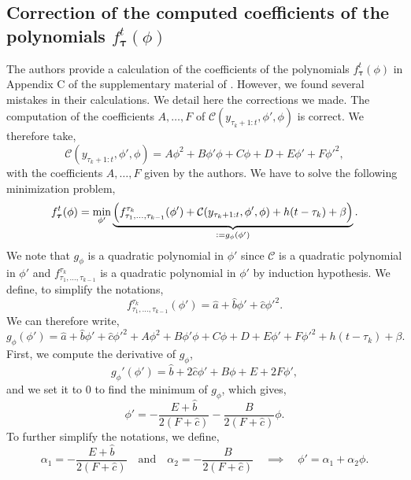 \documentclass[11pt]{article}
\begin{document}
\subsection{Correction of the computed coefficients of the polynomials $f^t_{\boldsymbol{\tau}}(\phi)$}
The authors provide a calculation of the coefficients of the polynomials $f^t_{\boldsymbol{\tau}}(\phi)$ in Appendix C of the supplementary material of \cite{mainarticle}. However, we found several mistakes in their calculations. We detail here the corrections we made.
\jump
The computation of the coefficients $A,\dots,F$ of $\mathcal{C}(y_{\tau_k+1:t},\phi',\phi)$ is correct. We therefore take,
\begin{equation}
    \mathcal{C}(y_{\tau_k+1:t},\phi',\phi) = A\phi^2+B\phi'\phi + C\phi + D + E\phi'+F{\phi'}^2,
\end{equation}
with the coefficients $A,\dots,F$ given by the authors.
\jump
We have to solve the following minimization problem,
\begin{equation}
    f_{\boldsymbol{\tau}}^t(\phi) = \min_{\phi'}\underbrace{\left(f^{\tau_k}_{\tau_1,\dots,\tau_{k-1}}(\phi')+\mathcal{C}(y_{\tau_k+1:t},\phi',\phi)+h(t-\tau_k)+\beta\right)}_{\vcentcolon = g_\phi(\phi')}.
\end{equation}
We note that $g_\phi$ is a quadratic polynomial in $\phi'$ since $\mathcal{C}$ is a quadratic polynomial in $\phi'$ and $f^{\tau_k}_{\tau_1,\dots,\tau_{k-1}}$ is a quadratic polynomial in $\phi'$ by induction hypothesis. We define, to simplify the notations,
\begin{equation*}
    f^{\tau_k}_{\tau_1,\dots,\tau_{k-1}}(\phi') = \hat{a} + \hat{b}\phi' + \hat{c}{\phi'}^2.
\end{equation*}
We can therefore write,
\begin{equation*}
    g_\phi(\phi') = \hat{a} + \hat{b}\phi' + \hat{c}{\phi'}^2 + A\phi^2+B\phi'\phi + C\phi + D + E\phi'+F{\phi'}^2 + h(t-\tau_k)+\beta.
\end{equation*}
First, we compute the derivative of $g_\phi$,
\begin{equation*}
    g_\phi'(\phi') = \hat{b} + 2\hat{c}\phi' + B\phi + E + 2F\phi',
\end{equation*}
and we set it to $0$ to find the minimum of $g_\phi$, which gives,
\begin{equation*}
    \phi' = -\frac{E + \hat{b}}{2(F+\hat{c})} - \frac{B}{2(F+\hat{c})}\phi.
\end{equation*}
To further simplify the notations, we define,
\begin{equation*}
    \alpha_1 = -\frac{E + \hat{b}}{2(F+\hat{c})} \quad \text{and} \quad \alpha_2 = - \frac{B}{2(F+\hat{c})} \quad \implies \quad \phi' = \alpha_1 + \alpha_2\phi.
\end{equation*}
\end{document}
